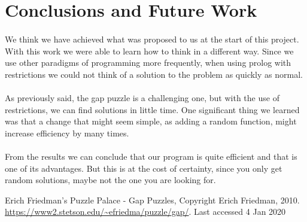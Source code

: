 \documentclass[runningheads]{llncs}
\begin{document}
\pagebreak
\section{Conclusions and Future Work}
\paragraph{}
We think we have achieved what was proposed to us at the start of this project. With this work we were able to learn how to think in a different way.
Since we use other paradigms of programming more frequently, when using prolog with restrictions we could not think of a solution to the problem as quickly as normal.
\paragraph{}
As previously said, the gap puzzle is a challenging one, but with the use of restrictions, we can find solutions in little time.
One significant thing we learned was that a change that might seem simple, as adding a random function, might increase efficiency by many times.
\paragraph{}
From the results we can conclude that our program is quite efficient and that is one of its advantages. But this is at the cost of certainty, since you only get random
solutions, maybe not the one you are looking for.

\begin{thebibliography}{8}
    Erich Friedman's Puzzle Palace - Gap Puzzles, Copyright Erich Friedman, 2010.
    \url{https://www2.stetson.edu/~efriedma/puzzle/gap/}.
    Last accessed 4 Jan 2020
    \end{thebibliography}
\end{document}
